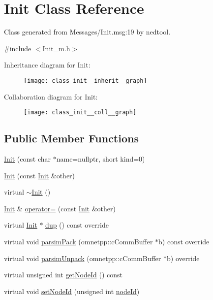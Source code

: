 \hypertarget{class_init}{}\section{Init Class Reference}
\label{class_init}


Class generated from {\ttfamily Messages/\+Init.\+msg\+:19} by nedtool.  




{\ttfamily \#include $<$Init\+\_\+m.\+h$>$}



Inheritance diagram for Init\+:
\nopagebreak
\begin{figure}[H]
\begin{center}
\leavevmode
\texttt{[image: class\_init\_\_inherit\_\_graph]}
\end{center}
\end{figure}


Collaboration diagram for Init\+:
\nopagebreak
\begin{figure}[H]
\begin{center}
\leavevmode
\texttt{[image: class\_init\_\_coll\_\_graph]}
\end{center}
\end{figure}
\subsection*{Public Member Functions}
\begin{DoxyCompactItemize}
\item 
\hyperlink{class_init_a763a386107f8ea21acfd24f243e0f73c}{Init} (const char $\ast$name=nullptr, short kind=0)
\item 
\hyperlink{class_init_a9d26400c5fabf20571808ad773524669}{Init} (const \hyperlink{class_init}{Init} \&other)
\item 
virtual \hyperlink{class_init_a67d5c94cb965fa3b774e969cfb4969d1}{$\sim$\+Init} ()
\item 
\hyperlink{class_init}{Init} \& \hyperlink{class_init_ab995dd231981ed97018c00b5fd8e9797}{operator=} (const \hyperlink{class_init}{Init} \&other)
\item 
virtual \hyperlink{class_init}{Init} $\ast$ \hyperlink{class_init_ad1e6c6b247eae6eaac5dd8e9dc9cdce0}{dup} () const override
\item 
virtual void \hyperlink{class_init_a73df5d54ec41b9980e98dbfc12875145}{parsim\+Pack} (omnetpp\+::c\+Comm\+Buffer $\ast$b) const override
\item 
virtual void \hyperlink{class_init_ab3728913400c516dbb31c8fed392d32d}{parsim\+Unpack} (omnetpp\+::c\+Comm\+Buffer $\ast$b) override
\item 
virtual unsigned int \hyperlink{class_init_a67fdac2389d7298a742e33a6551e8eb1}{get\+Node\+Id} () const
\item 
virtual void \hyperlink{class_init_a21b64722ff60f3ecf3b17939c0a1cb6d}{set\+Node\+Id} (unsigned int \hyperlink{class_init_abc9fcf6151621f0ac808cd29e14239c9}{node\+Id})
\end{DoxyCompactItemize}
